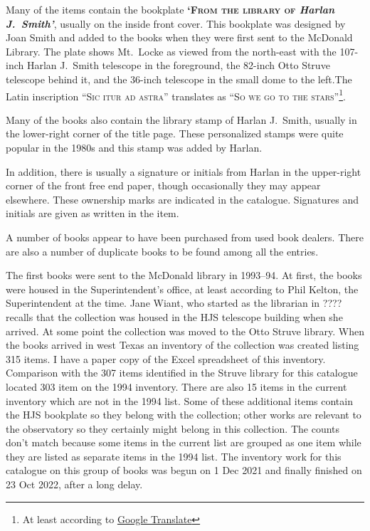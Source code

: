 Many of the items contain the bookplate {\bfseries\textsc{`From the
    library of} \textit{Harlan J.~Smith'}}, usually on the inside
front cover. This bookplate was designed by Joan Smith and added to
the books when they were first sent to the McDonald Library. The plate
shows Mt.~Locke as viewed from the north-east with the 107-inch Harlan
J.~Smith telescope in the foreground, the 82-inch Otto Struve
telescope behind it, and the 36-inch telescope in the small dome to
the left.The Latin inscription \textsc{``Sic itur ad astra''}
translates as \textsc{``So we go to the stars''}\footnote{At least
according to \href{https://translate.google.com}{Google Translate}}.

Many of the books also contain the library stamp of Harlan J.~Smith,
usually in the lower-right corner of the title page. These
personalized stamps were quite popular in the 1980s and this stamp was
added by Harlan.

In addition, there is usually a signature or initials from Harlan in
the upper-right corner of the front free end paper, though
occasionally they may appear elsewhere.  These ownership marks are
indicated in the catalogue.  Signatures and initials are given as
written in the item.

A number of books appear to have been purchased from used book
dealers.  There are also a number of duplicate books to be found among
all the entries.

The first books were sent to the McDonald library in 1993--94. At
first, the books were housed in the Superintendent's office, at least
according to Phil Kelton, the Superintendent at the time.  Jane Wiant,
who started as the librarian in ???? recalls that the collection was
housed in the HJS telescope building when she arrived.  At some point
the collection was moved to the Otto Struve library.  When the books
arrived in west Texas an inventory of the collection was created
listing 315 items. I have a paper copy of the Excel spreadsheet of
this inventory.  Comparison with the 307 items identified in the
Struve library for this catalogue located 303 item on the 1994
inventory. There are also 15 items in the current inventory which are
not in the 1994 list. Some of these additional items contain the HJS
bookplate so they belong with the collection; other works are relevant
to the observatory so they certainly might belong in this
collection. The counts don't match because some items in the current
list are grouped as one item while they are listed as separate items
in the 1994 list.  The inventory work for this catalogue on this
group of books was begun on 1 Dec 2021 and finally finished on 23 Oct
2022, after a long delay.

